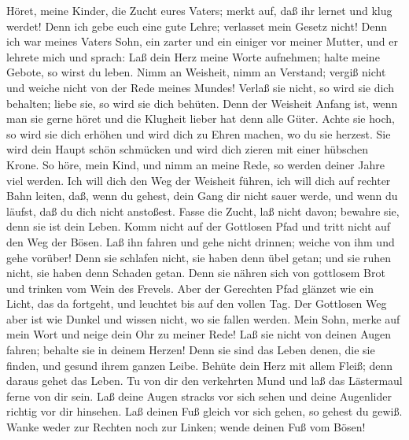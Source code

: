  Höret, meine Kinder, die Zucht eures Vaters; merkt auf, daß
ihr lernet und klug werdet!  Denn ich gebe euch eine gute
Lehre; verlasset mein Gesetz nicht!  Denn ich war meines
Vaters Sohn, ein zarter und ein einiger vor meiner Mutter, 
und er lehrete mich und sprach: Laß dein Herz meine Worte aufnehmen;
halte meine Gebote, so wirst du leben.  Nimm an Weisheit,
nimm an Verstand; vergiß nicht und weiche nicht von der Rede meines
Mundes!  Verlaß sie nicht, so wird sie dich behalten; liebe
sie, so wird sie dich behüten.  Denn der Weisheit Anfang
ist, wenn man sie gerne höret und die Klugheit lieber hat denn alle
Güter.  Achte sie hoch, so wird sie dich erhöhen und wird
dich zu Ehren machen, wo du sie herzest.  Sie wird dein
Haupt schön schmücken und wird dich zieren mit einer hübschen Krone.
 So höre, mein Kind, und nimm an meine Rede, so werden
deiner Jahre viel werden.  Ich will dich den Weg der
Weisheit führen, ich will dich auf rechter Bahn leiten, 
daß, wenn du gehest, dein Gang dir nicht sauer werde, und wenn du
läufst, daß du dich nicht anstoßest.  Fasse die Zucht, laß
nicht davon; bewahre sie, denn sie ist dein Leben.  Komm
nicht auf der Gottlosen Pfad und tritt nicht auf den Weg der Bösen.
 Laß ihn fahren und gehe nicht drinnen; weiche von ihm und
gehe vorüber!  Denn sie schlafen nicht, sie haben denn übel
getan; und sie ruhen nicht, sie haben denn Schaden getan. 
Denn sie nähren sich von gottlosem Brot und trinken vom Wein des
Frevels.  Aber der Gerechten Pfad glänzet wie ein Licht,
das da fortgeht, und leuchtet bis auf den vollen Tag.  Der
Gottlosen Weg aber ist wie Dunkel und wissen nicht, wo sie fallen
werden.  Mein Sohn, merke auf mein Wort und neige dein Ohr
zu meiner Rede!  Laß sie nicht von deinen Augen fahren;
behalte sie in deinem Herzen!  Denn sie sind das Leben
denen, die sie finden, und gesund ihrem ganzen Leibe. 
Behüte dein Herz mit allem Fleiß; denn daraus gehet das Leben.
 Tu von dir den verkehrten Mund und laß das Lästermaul
ferne von dir sein.  Laß deine Augen stracks vor sich sehen
und deine Augenlider richtig vor dir hinsehen.  Laß deinen
Fuß gleich vor sich gehen, so gehest du gewiß.  Wanke weder
zur Rechten noch zur Linken; wende deinen Fuß vom Bösen!

